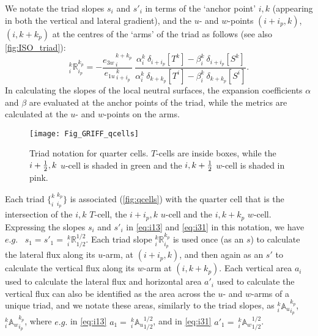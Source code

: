 \documentclass[../main/NEMO_manual]{subfiles}
\begin{document}
We notate the triad slopes $s_i$ and $s'_i$ in terms of the `anchor point' $i,k$
(appearing in both the vertical and lateral gradient),
and the $u$- and $w$-points $(i+i_p,k)$, $(i,k+k_p)$ at the centres of the `arms' of the triad as follows
(see also \autoref{fig:ISO_triad}):
\begin{equation}
  \label{eq:R}
  _i^k \mathbb{R}_{i_p}^{k_p}
  =-\frac{ {e_{3w}}_{\,i}^{\,k+k_p}} { {e_{1u}}_{\,i+i_p}^{\,k}}
  \
  \frac
  { \alpha_i^k  \ \delta_{i+i_p}[T^k] - \beta_i^k \ \delta_{i+i_p}[S^k] }
  { \alpha_i^k  \ \delta_{k+k_p}[T^i] - \beta_i^k \ \delta_{k+k_p}[S^i] }.
\end{equation}
In calculating the slopes of the local neutral surfaces,
the expansion coefficients $\alpha$ and $\beta$ are evaluated at the anchor points of the triad,
while the metrics are calculated at the $u$- and $w$-points on the arms.

\begin{figure}[tb]
  \begin{center}
    \texttt{[image: Fig\_GRIFF\_qcells]}
    \caption{
      \protect\label{fig:qcells}
      Triad notation for quarter cells. $T$-cells are inside boxes,
      while the  $i+\textstyle\frac{1}{2},k$ $u$-cell is shaded in green and
      the $i,k+\textstyle\frac{1}{2}$ $w$-cell is shaded in pink.
    }
  \end{center}
\end{figure}

Each triad $\{_i^{k}\:_{i_p}^{k_p}\}$ is associated (\autoref{fig:qcells}) with the quarter cell that is
the intersection of the $i,k$ $T$-cell, the $i+i_p,k$ $u$-cell and the $i,k+k_p$ $w$-cell.
Expressing the slopes $s_i$ and $s'_i$ in \autoref{eq:i13} and \autoref{eq:i31} in this notation,
we have $e.g.$ \ $s_1=s'_1={\:}_i^k \mathbb{R}_{1/2}^{1/2}$.
Each triad slope $_i^k\mathbb{R}_{i_p}^{k_p}$ is used once (as an $s$) to
calculate the lateral flux along its $u$-arm, at $(i+i_p,k)$,
and then again as an $s'$ to calculate the vertical flux along its $w$-arm at $(i,k+k_p)$.
Each vertical area $a_i$ used to calculate the lateral flux and horizontal area $a'_i$ used to
calculate the vertical flux can also be identified as the area across the $u$- and $w$-arms of a unique triad,
and we notate these areas, similarly to the triad slopes,
as $_i^k{\mathbb{A}_u}_{i_p}^{k_p}$, $_i^k{\mathbb{A}_w}_{i_p}^{k_p}$,
where $e.g.$ in \autoref{eq:i13} $a_{1}={\:}_i^k{\mathbb{A}_u}_{1/2}^{1/2}$,
and in \autoref{eq:i31} $a'_{1}={\:}_i^k{\mathbb{A}_w}_{1/2}^{1/2}$.
\end{document}

